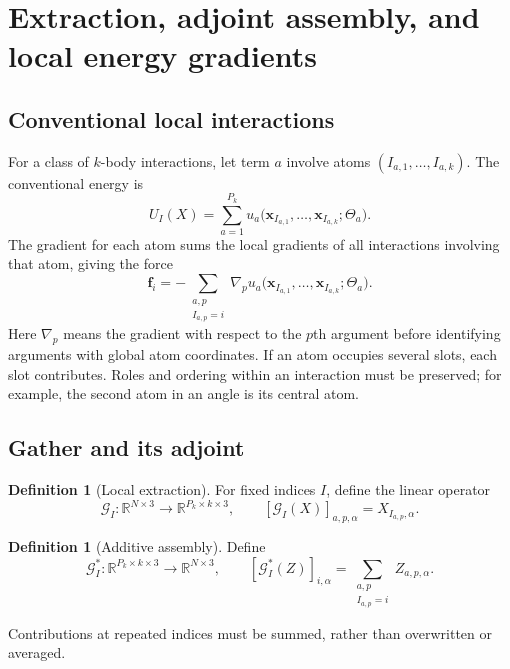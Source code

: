 \documentclass[11pt,a4paper]{article}
\newcommand{\RR}{\mathbb R}
\newcommand{\vect}[1]{\bm{#1}}
\newcommand{\GE}{\mathcal G_I}
\theoremstyle{definition}
\newtheorem{definition}[proposition]{Definition}
\begin{document}
\section{Extraction, adjoint assembly, and local energy gradients}
\label{sec:gather}
\subsection{Conventional local interactions}
For a class of $k$-body interactions, let term $a$ involve atoms
$(I_{a,1},\ldots,I_{a,k})$. The conventional energy is
\begin{equation}
U_I(X)=\sum_{a=1}^{P_k}
u_a\bigl(\vect x_{I_{a,1}},\ldots,\vect x_{I_{a,k}};\Theta_a\bigr).
\label{eq:local-classic}
\end{equation}
The gradient for each atom sums the local gradients of all interactions involving that atom,
giving the force
\begin{equation}
\vect f_i=-\sum_{\substack{a,p\\I_{a,p}=i}}
\nabla_p u_a\bigl(\vect x_{I_{a,1}},\ldots,\vect x_{I_{a,k}};\Theta_a\bigr).
\label{eq:local-classic-force}
\end{equation}
Here $\nabla_p$ means the gradient with respect to the $p$th argument before identifying
arguments with global atom coordinates. If an atom occupies several slots, each slot contributes.
Roles and ordering within an interaction must be preserved; for example, the second atom in an
angle is its central atom.

\subsection{Gather and its adjoint}
\begin{definition}[Local extraction]
For fixed indices $I$, define the linear operator
\begin{equation}
\GE:\RR^{N\times3}\to\RR^{P_k\times k\times3},\qquad
[\GE(X)]_{a,p,\alpha}=X_{I_{a,p},\alpha}.
\label{eq:gather}
\end{equation}
\end{definition}
\begin{definition}[Additive assembly]
Define
\begin{equation}
\GE^*:\RR^{P_k\times k\times3}\to\RR^{N\times3},\qquad
[\GE^*(Z)]_{i,\alpha}=\sum_{\substack{a,p\\I_{a,p}=i}} Z_{a,p,\alpha}.
\label{eq:assemble}
\end{equation}
\end{definition}
Contributions at repeated indices must be summed, rather than overwritten or averaged.
\end{document}
